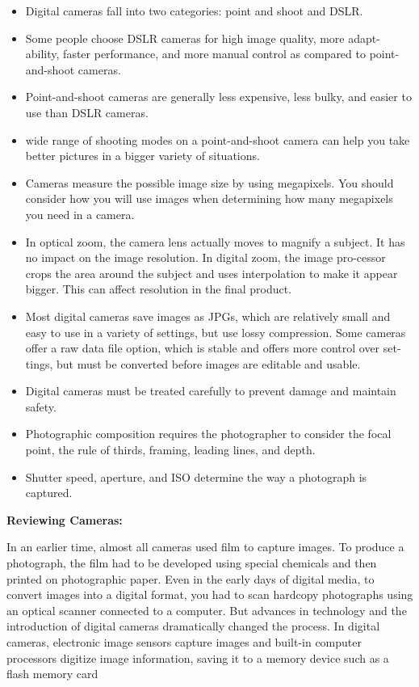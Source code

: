 \documentclass{report}
\begin{document}
    \bigbreak \noindent 
    \begin{itemize}
         \item Digital cameras fall into two categories: point and shoot and DSLR. 
         \item Some people choose DSLR cameras for high image quality, more adapt-ability, faster performance, and more manual control as compared to point-and-shoot cameras. 
         \item Point-and-shoot cameras are generally less expensive, less bulky, and easier to use than DSLR cameras. 
         \item wide range of shooting modes on a point-and-shoot camera can help you take better pictures in a bigger variety of situations. 
         \item Cameras measure the possible image size by using megapixels. You should consider how you will use images when determining how many megapixels you need in a camera. 
         \item In optical zoom, the camera lens actually moves to magnify a subject. It has no impact on the image resolution. In digital zoom, the image pro-cessor crops the area around the subject and uses interpolation to make it appear bigger. This can affect resolution in the final product.
         \item Most digital cameras save images as JPGs, which are relatively small and easy to use in a variety of settings, but use lossy compression. Some cameras offer a raw data file option, which is stable and offers more control over set-tings, but must be converted before images are editable and usable.
         \item Digital cameras must be treated carefully to prevent damage and maintain safety. 
         \item Photographic composition requires the photographer to consider the focal point, the rule of thirds, framing, leading lines, and depth.
         \item Shutter speed, aperture, and ISO determine the way a photograph is  captured. 
    \end{itemize}

    \pagebreak
    \begin{Large}
        \noindent \textbf{Reviewing Cameras:}
    \end{Large}

    \bigbreak \noindent 
    In an earlier time, almost all cameras used film to capture images. To produce a photograph, the film had to be developed using special chemicals and then printed on photographic paper. Even in the early days of digital media, to convert images into a digital format, you had to scan hardcopy photographs using an optical scanner connected to a computer. But advances in technology and the introduction of  digital cameras dramatically changed the process. In digital cameras, electronic image sensors capture images and built-in computer  processors digitize image information, saving it to a memory device such as a flash memory card
\end{document}
